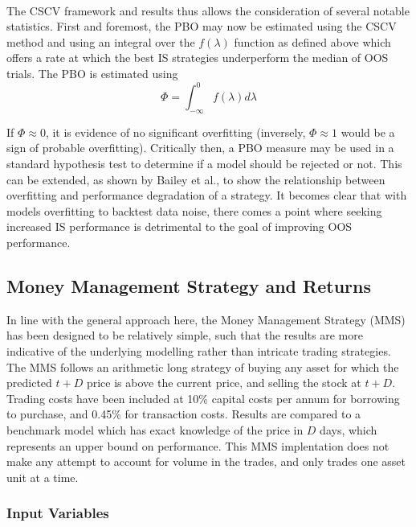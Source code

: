 \documentclass[a4paper,11pt,oneside]{article}
\theoremstyle{plain}
\theoremstyle{definition}
\begin{document}
\texttt{\\}
\newline The CSCV framework and results thus allows the consideration of several notable statistics. First and foremost, 
the PBO may now be estimated using the CSCV method and using an integral over the $f(\lambda)$ function 
as defined above which offers a rate at which the best IS strategies underperform the median of OOS trials. The PBO is estimated using
\begin{equation}
\Phi = \int_{-\infty}^{0} f (\lambda) d \lambda
\end{equation}


If $\Phi \approx 0$,
it is evidence of no significant overfitting (inversely, $\Phi \approx 1$ would be a sign of probable overfitting). Critically then, a PBO measure may be used in a standard hypothesis test to determine if a model should be rejected or not. This 
can be extended, as shown by Bailey et al., to show the relationship between overfitting and performance 
degradation of a strategy. It becomes clear that with models overfitting to backtest data noise, there comes a point 
where seeking increased IS performance is detrimental to the goal of improving OOS performance.  
\hfill \break 


\subsection{Money Management Strategy and Returns}\label{imp_mms}

In line with the general approach here, the Money Management Strategy (MMS) has been designed to be relatively simple, such that the results are more indicative of the underlying modelling rather than intricate trading strategies. The MMS follows an arithmetic long strategy of buying any asset for which the predicted ${t+D}$ price is above the current price, and selling the stock at ${t+D}$. Trading costs have been included at 10\% capital costs per annum for borrowing to purchase, and 0.45\% for transaction costs. Results are compared to a benchmark model which has exact knowledge of the price in $D$ days, which represents an upper bound on performance. This MMS implentation does not make any attempt to account for volume in the trades, and only trades one asset unit at a time.
\hfill\break

\subsubsection{Input Variables}
\end{document}

